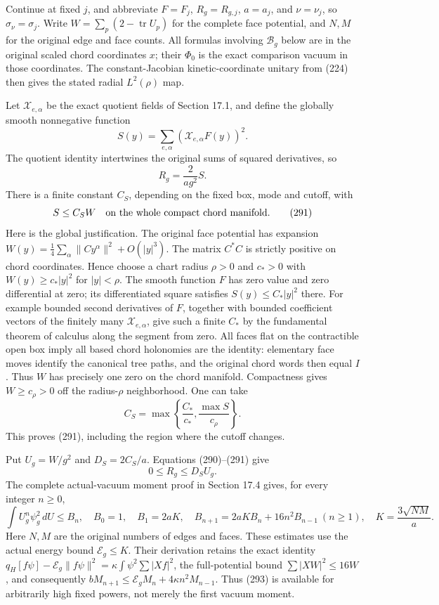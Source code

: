 \documentclass[
  11pt,
]{article}
\begin{document}
Continue at fixed \(j\), and abbreviate \(F=F_j\), \(R_g=R_{g,j}\),
\(a=a_j\), and \(\nu=\nu_j\), so \(\sigma_\nu=\sigma_j\). Write
\(W=\sum_p(2-\operatorname{tr}U_p)\) for the complete face potential,
and \(N,M\) for the original edge and face counts. All formulas
involving \(\mathcal B_g\) below are in the original scaled chord
coordinates \(x\); their \(\Phi_0\) is the exact comparison vacuum in
those coordinates. The constant-Jacobian kinetic-coordinate unitary from
(224) then gives the stated radial \(L^2(\rho)\) map.

Let \(\mathcal X_{e,\alpha}\) be the exact quotient fields of Section
17.1, and define the globally smooth nonnegative function \[
 S(y)=\sum_{e,\alpha}(\mathcal X_{e,\alpha}F(y))^2.
\] The quotient identity intertwines the original sums of squared
derivatives, so \[
 R_g=\frac{2}{ag^2}S.
 \tag{290}
\] There is a finite constant \(C_S\), depending on the fixed box, mode
and cutoff, with \[
 S\le C_SW \quad\hbox{on the whole compact chord manifold}.
 \tag{291}
\] Here is the global justification. The original face potential has
expansion \(W(y)=\frac14\sum_\alpha\|Cy^\alpha\|^2+O(|y|^3)\). The
matrix \(C^*C\) is strictly positive on chord coordinates. Hence choose
a chart radius \(\rho>0\) and \(c_*>0\) with \(W(y)\ge c_*|y|^2\) for
\(|y|<\rho\). The smooth function \(F\) has zero value and zero
differential at zero; its differentiated square satisfies
\(S(y)\le C_*|y|^2\) there. For example bounded second derivatives of
\(F\), together with bounded coefficient vectors of the finitely many
\(\mathcal X_{e,\alpha}\), give such a finite \(C_*\) by the fundamental
theorem of calculus along the segment from zero. All faces flat on the
contractible open box imply all based chord holonomies are the identity:
elementary face moves identify the canonical tree paths, and the
original chord words then equal \(I\). Thus \(W\) has precisely one zero
on the chord manifold. Compactness gives \(W\ge c_\rho>0\) off the
radius-\(\rho\) neighborhood. One can take \[
 C_S=\max\left\{\frac{C_*}{c_*},
                 \frac{\max S}{c_\rho}\right\}.
\] This proves (291), including the region where the cutoff changes.

Put \(U_g=W/g^2\) and \(D_S=2C_S/a\). Equations (290)--(291) give \[
 0\le R_g\le D_SU_g.
 \tag{292}
\] The complete actual-vacuum moment proof in Section 17.4 gives, for
every integer \(n\ge0\), \[
 \int U_g^n\psi_g^2\,dU\le B_n,\quad
 B_0=1,\quad B_1=2aK,\quad
 B_{n+1}=2aK B_n+16n^2B_{n-1}\ (n\ge1),\quad
 K=\frac{3\sqrt{NM}}a.
 \tag{293}
\] Here \(N,M\) are the original numbers of edges and faces. These
estimates use the actual energy bound \(\mathcal E_g\le K\). Their
derivation retains the exact identity
\(q_H[f\psi]-\mathcal E_g\|f\psi\|^2
=\kappa\int\psi^2\sum|Xf|^2\), the full-potential bound
\(\sum|XW|^2\le16W\), and consequently
\(bM_{n+1}\le\mathcal E_g M_n+4\kappa n^2M_{n-1}\). Thus (293) is
available for arbitrarily high fixed powers, not merely the first vacuum
moment.
\end{document}
